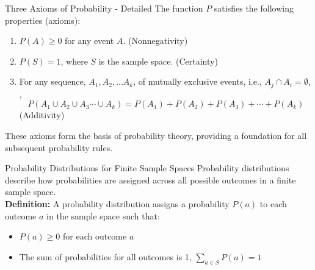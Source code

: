 \documentclass[handout]{beamer} %
\begin{document}
\begin{frame}{Three Axioms of Probability - Detailed}
    The function \(P\) satisfies the following properties (axioms):\pause
    \begin{enumerate}
        \item \(P(A) \geq 0\) for any event \(A\). (Nonnegativity)\pause
        \item \(P(S) = 1\), where \(S\) is the sample space. (Certainty)\pause
        \item For any sequence, \(A_1, A_2, \ldots A_k\), of mutually exclusive events, i.e., $A_j \cap A_i =\emptyset$, , \[P\left(A_1 \cup A_2 \cup A_3 \cdots \cup A_k \right) = P(A_1)+P(A_2)+P(A_3) + \cdots + P(A_k)\] (Additivity)\pause
    \end{enumerate}
    \vspace{2em}
    These axioms form the basis of probability theory, providing a foundation for all subsequent probability rules.
\end{frame}

\begin{frame}{Probability Distributions for Finite Sample Spaces}
    Probability distributions describe how probabilities are assigned across all possible outcomes in a finite sample space. \\ \pause
\vspace{2em}
    \textbf{Definition:}
    A probability distribution assigns a probability \( P(a) \) to each outcome \( a \) in the sample space such that:\pause
    \begin{itemize}
        \item \( P(a) \geq 0 \) for each outcome \( a \)\pause
        \item The sum of probabilities for all outcomes is 1, \( \sum_{a \in S} P(a) = 1 \) \pause {}
    \end{itemize}

\end{frame}
\end{document}
